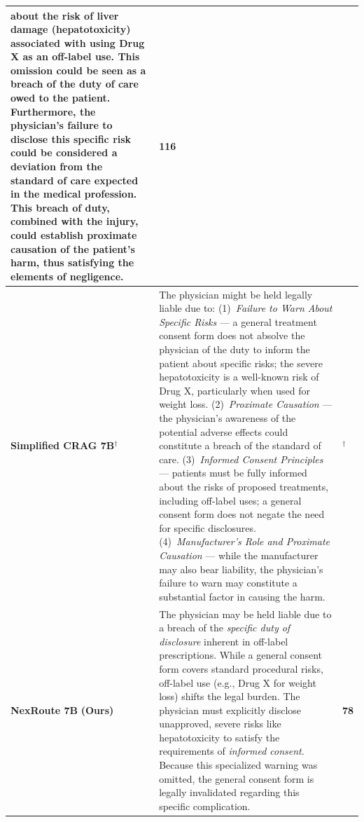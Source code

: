 \documentclass[a4paper,fleql,doubleblind]{cas-sc}
\begin{document}
\begin{center}
\begin{tabular}{m{2.3cm} | m{10.0cm} | >{\centering\arraybackslash}m{1.5cm}}
about the risk of liver damage (hepatotoxicity) associated with using Drug X as
an off-label use. This omission could be seen as a breach of the duty of care
owed to the patient. Furthermore, the physician's failure to disclose this
specific risk could be considered a deviation from the standard of care
expected in the medical profession. This breach of duty, combined with the
injury, could establish proximate causation of the patient's harm, thus
satisfying the elements of negligence. & 116 \\
\midrule
\textbf{Simplified CRAG 7B}$^\dagger$
& The physician might be held legally liable due to:
(1)~\textit{Failure to Warn About Specific Risks} --- a general treatment
consent form does not absolve the physician of the duty to inform the patient
about specific risks; the severe hepatotoxicity is a well-known risk of Drug X,
particularly when used for weight loss.
(2)~\textit{Proximate Causation} --- the physician's awareness of the potential
adverse effects could constitute a breach of the standard of care.
(3)~\textit{Informed Consent Principles} --- patients must be fully informed
about the risks of proposed treatments, including off-label uses; a general
consent form does not negate the need for specific disclosures.
(4)~\textit{Manufacturer's Role and Proximate Causation} --- while the
manufacturer may also bear liability, the physician's failure to warn may
constitute a substantial factor in causing the harm. & 256$^\dagger$ \\
\midrule
\textbf{NexRoute 7B} \newline \small\textbf{(Ours)}
& The physician may be held liable due to a breach of the \textit{specific duty
of disclosure} inherent in off-label prescriptions. While a general consent
form covers standard procedural risks, off-label use (e.g., Drug X for weight
loss) shifts the legal burden. The physician must explicitly disclose
unapproved, severe risks like hepatotoxicity to satisfy the requirements of
\textit{informed consent}. Because this specialized warning was omitted, the
general consent form is legally invalidated regarding this specific
complication. & \textbf{78} \\
\bottomrule
\end{tabular}
\endgroup
\end{center}
\vspace{6pt plus 4pt minus 3pt}

\newpage
\end{document}
